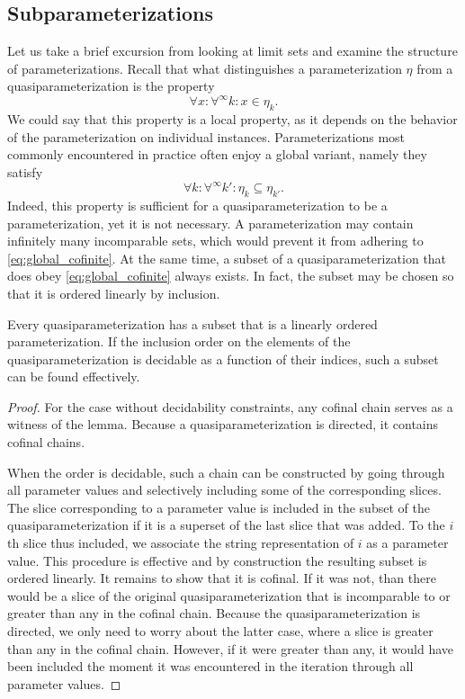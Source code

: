 \subsection{Subparameterizations}
Let us take a brief excursion from looking at limit sets and examine the structure of parameterizations.
Recall that what distinguishes a parameterization $\eta$ from a quasiparameterization is the property
\begin{equation*}
  \forall x\colon \forall^\infty k\colon x \in \eta_k.
\end{equation*}
We could say that this property is a local property, as it depends on the behavior of the parameterization on individual instances.
Parameterizations most commonly encountered in practice \parencite{niedermeier2006invitation} often enjoy a global variant, namely they satisfy
\begin{equation}
\label{eq:global_cofinite}
  \forall k\colon \forall^\infty k'\colon \eta_k \subseteq \eta_{k'}.
\end{equation}
Indeed, this property is sufficient for a quasiparameterization to be a parameterization, yet it is not necessary.
A parameterization may contain infinitely many incomparable sets, which would prevent it from adhering to \eqref{eq:global_cofinite}.
At the same time, a subset of a quasiparameterization that does obey \eqref{eq:global_cofinite} always exists.
In fact, the subset may be chosen so that it is ordered linearly by inclusion.
\begin{lemma}
\label{lem:cofinal_chain}%
  Every quasiparameterization has a subset that is a linearly ordered parameterization.
  If the inclusion order on the elements of the quasiparameterization is decidable as a function of their indices, such a subset can be found effectively.
\end{lemma}
\begin{proof}
  For the case without decidability constraints, any cofinal chain \parencite{abramsky1994domain} serves as a witness of the lemma.
  Because a quasiparameterization is directed, it contains cofinal chains.

  When the order is decidable, such a chain can be constructed by going through all parameter values and selectively including some of the corresponding slices.
  The slice corresponding to a parameter value is included in the subset of the quasiparameterization if it is a superset of the last slice that was added.
  To the $i$th slice thus included, we associate the string representation of $i$ as a parameter value.
  This procedure is effective and by construction the resulting subset is ordered linearly.
  It remains to show that it is cofinal.
  If it was not, than there would be a slice of the original quasiparameterization that is incomparable to or greater than any in the cofinal chain.
  Because the quasiparameterization is directed, we only need to worry about the latter case, where a slice is greater than any in the cofinal chain.
  However, if it were greater than any, it would have been included the moment it was encountered in the iteration through all parameter values.
\end{proof}

